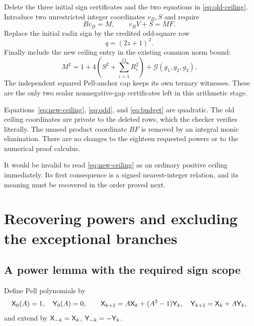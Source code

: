 \documentclass[11pt,letterpaper]{article}
\theoremstyle{remark}\newtheorem{remark}[theorem]{Remark}
\newcommand{\G}{\mathcal G}
\begin{document}
Delete the three initial sign certificates and the two equations in \eqref{eq:old-ceiling}. Introduce two unrestricted integer coordinates $v_B,S$ and require
\begin{equation}\label{eq:new-ceiling}
 \boxed{Bv_B=M,\qquad v_BV+S=MF.}
\end{equation}
Replace the initial radix sign by the credited odd-square row
\begin{equation}\label{eq:odd}
 q=(2z+1)^2.
\end{equation}
Finally include the new ceiling entry in the existing common norm bound:
\begin{equation}\label{eq:budget}
 \boxed{M^2=1+4\left(S^2+\sum_{i=1}^{11}R_i^2\right)
                  +\G(g_1,g_2,g_3).}
\end{equation}
The independent squared Pell-anchor cap keeps its own ternary witnesses. These are the only two scalar nonnegative-gap certificates left in this arithmetic stage.

Equations~\eqref{eq:new-ceiling}, \eqref{eq:odd}, and \eqref{eq:budget} are quadratic. The old ceiling coordinates are private to the deleted rows, which the checker verifies literally. The unused product coordinate $BF$ is removed by an integral monic elimination. There are no changes to the eighteen requested powers or to the numerical proof calculus.

It would be invalid to read \eqref{eq:new-ceiling} as an ordinary positive ceiling immediately. Its first consequence is a signed nearest-integer relation, and its meaning must be recovered in the order proved next.

\section{Recovering powers and excluding the exceptional branches}
\label{sec:bootstrap}
\subsection{A power lemma with the required sign scope}
Define Pell polynomials by
\[
 \mathsf X_0(A)=1,\quad \mathsf Y_0(A)=0,\qquad
 \mathsf X_{k+1}=A\mathsf X_k+(A^2-1)\mathsf Y_k,\quad
 \mathsf Y_{k+1}=\mathsf X_k+A\mathsf Y_k,
\]
and extend by $\mathsf X_{-k}=\mathsf X_k$, $\mathsf Y_{-k}=-\mathsf Y_k$.
\end{document}
